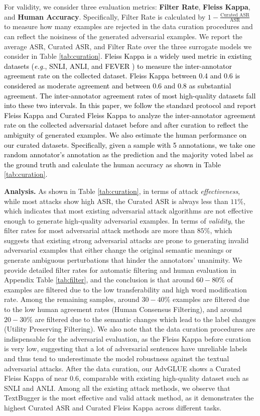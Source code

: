 \documentclass{article}
\newcommand{\method}{AdvGLUE\xspace}
\newcommand{\m}[1]{{\textcolor{black}{{#1}}}}
\begin{document}
For validity, we consider three evaluation metrics: \textbf{Filter Rate}, \textbf{Fleiss Kappa}, and \textbf{Human Accuracy}. Specifically, Filter Rate is calculated by $1 - \frac{\textrm{Curated ASR}}{\textrm{ASR}}$ to measure how many examples are rejected in the data curation procedures and can reflect the noisiness of the generated adversarial examples. 
We report the average ASR, Curated ASR, and Filter Rate over the three surrogate models we consider in Table \ref{tab:curation}.
\m{Fleiss Kappa is a widely used metric in existing datasets (\emph{e.g.}, SNLI, ANLI, and FEVER \citep{snli, anli, fever}) to measure the inter-annotator agreement rate on the collected dataset. Fleiss Kappa between 0.4 and 0.6 is considered as moderate agreement and between 0.6 and 0.8 as substantial agreement. The inter-annotator agreement rates of most high-quality datasets fall into these two intervals. In this paper, we follow the standard protocol and report Fleiss Kappa and Curated Fleiss Kappa to analyze the inter-annotator agreement rate on the collected adversarial dataset before and after curation to reflect the ambiguity of  generated  examples. We also estimate the human performance on our curated datasets. Specifically, given a sample with 5 annotations, we take one random annotator's annotation as the prediction and the majority voted label as the ground truth and calculate the human accuracy as shown in Table \ref{tab:curation}.} 

\textbf{Analysis.} As shown in Table \ref{tab:curation}, in terms of attack \textit{effectiveness}, while most attacks show high ASR, the Curated ASR is always less than $11\%$, which indicates that most existing adversarial attack algorithms are not effective enough to generate high-quality adversarial examples. 
In terms of \textit{validity}, the filter rates for most adversarial attack methods are more than $85\%$, which suggests that existing strong adversarial attacks are prone to generating invalid adversarial examples that either change the original semantic meanings or generate ambiguous perturbations that hinder the annotators' unanimity. We provide detailed filter rates for automatic filtering and human evaluation in Appendix Table \ref{tab:filter}, and the conclusion is that around $60-80\%$ of examples are filtered due to the low transferability and high word modification rate. Among the remaining samples, around $30-40\%$ examples are filtered due to the low human agreement rates (Human Consensus Filtering), and around $20-30\%$ are filtered due to the semantic changes which lead to the label changes (Utility Preserving Filtering). We also note that the data curation procedures are indispensable for the adversarial evaluation, as the Fleiss Kappa before curation is very low, suggesting that a lot of adversarial sentences have unreliable labels and thus tend to underestimate the model robustness against the textual adversarial attacks. After the data curation, our \method shows a Curated Fleiss Kappa of near 0.6,
comparable with existing high-quality dataset such as SNLI and ANLI.  
Among all the existing attack methods, we observe that TextBugger is the most effective and valid attack method, as it demonstrates the highest Curated ASR and Curated Fleiss Kappa across different  tasks.
\end{document}

